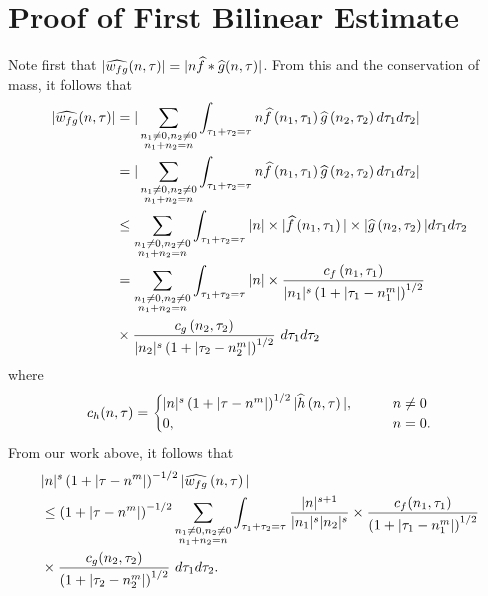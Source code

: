 \section{Proof of First Bilinear Estimate}
Note first that $|\widehat{w_{fg}}(n, \tau) |  = | n\widehat{f} *  \widehat{g} 
(n, \tau)|$. From this and the conservation of mass, it follows that
%
%
\begin{equation}
	\label{mnon-lin-rep}
	\begin{split}
		| \widehat{w_{fg}}(n, \tau)|
		& = | \sum_{\substack{n_1 \neq 0, n_2 \neq 0 \\n_1 +n_2 =n}}  \int_{\tau_1 + \tau_2 = \tau}n\widehat{f}\left( n_1,  \tau_1 
\right) \widehat{g}\left( n_2, \tau_2  
\right) d \tau_1 d \tau_2 |
\\
& = | \sum_{\substack{n_1 \neq0, n_2 \neq 0 \\n_1 + n_2 =n}}  \int_{\tau_1 + \tau_2 = \tau}n\widehat{f}\left( n_1,  \tau_1 
\right) \widehat{g}\left( n_2, \tau_2  
\right) d \tau_1 d \tau_2 | 
\\
& \le \sum_{\substack{n_1 \neq0, n_2 \neq 0 \\n_1 + n_2 =n}}   \int_{\tau_1 + \tau_2 = \tau}| n | \times | \widehat{f}\left( n_1, \tau_1 
\right) | \times  | \widehat{g}\left( n_2, \tau_2 
\right) |   d \tau_1 d \tau_2  
\\
& = \sum_{\substack{n_1 \neq0, n_2 \neq 0 \\n_1 + n_2 =n}} \int_{\tau_1 + \tau_2 = \tau}| n | \times \frac{c_f\left( n_1, \tau_1 
\right)}{|n_1|^s \left( 1 + | \tau_1 - n_1^m | \right)^{1/2}}
\\
& \times \frac{c_{g}\left( n_2, \tau_2 \right)}{|n_2|^s\left( 1 + | \tau_2 -  n_2^m| 
\right)^{1/2}}
  \ d \tau_1 d \tau_2 
\end{split}
\end{equation}
%
%
where 
%
%
\begin{equation*}
	\begin{split}
		c_h(n, \tau) =
		\begin{cases}
			|n|^s \left( 1 + | \tau - n^m |  
			\right)^{1/2} | \widehat{h}\left( n, \tau \right) |, \qquad & n \neq 0
		\\
		0, \qquad & n = 0.
	\end{cases}
	\end{split}
\end{equation*}
%
%
From our work above, it follows that 
%
%
\begin{equation}
	\label{mconvo-est-starting-pnt}
	\begin{split}
		 & |n|^s \left( 1 + | \tau - n^m | \right)^{-1/2} | \widehat{w_{fg}}\left( 
		n, \tau \right) |
		\\
		& \le \left( 1 + | \tau - n^m | \right)^{-1/2}
		\sum_{\substack{n_1 \neq0, n_2 \neq 0 \\n_1 + n_2 =n}} \int_{\tau_1 + \tau_2 = \tau}\frac{|n|^{s+1}}{|n_1|^s | n_2|^s} 
		\times \frac{c_f(n_1, \tau_1)}{\left( 1 + | \tau_1 - n_1^m | 
		\right)^{1/2}}
		\\
		& \times
		\frac{c_g(n_2, \tau_2)}{\left( 1 + | \tau_2 - n_2^m | 
		\right)^{1/2}}\ d \tau_1 d \tau_2.
	\end{split}
\end{equation}
